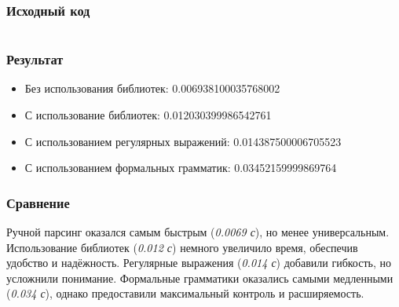 \subsubsection{Исходный код}
\inputminted[breaklines]{python}{../task_5.py}

\subsubsection{Результат}
\begin{itemize}
	\item Без использования библиотек: 0.006938100035768002
	\item С использование библиотек: 0.012030399986542761
	\item С использованием регулярных выражений: 0.014387500006705523
	\item С использованием формальных грамматик: 0.03452159999869764
\end{itemize}

\subsubsection{Сравнение}
Ручной парсинг оказался самым быстрым (\textit{0.0069 с}), но менее универсальным. Использование библиотек (\textit{0.012 с}) немного увеличило время, обеспечив удобство и надёжность. Регулярные выражения (\textit{0.014 с}) добавили гибкость, но усложнили понимание. Формальные грамматики оказались самыми медленными (\textit{0.034 с}), однако предоставили максимальный контроль и расширяемость.